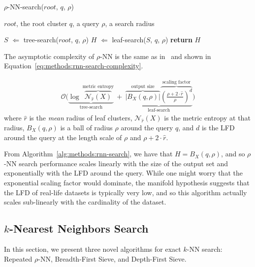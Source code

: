 \begin{algorithm} 
    \caption{$\rho$-NN-search($root$, $q$, $\rho$)} 
    \label{alg:methods:rnn-search} 
    \begin{algorithmic}
        \REQUIRE $root$, the root cluster
        \REQUIRE $q$, a query
        \REQUIRE $\rho$, a search radius

        \STATE $S$ $\Leftarrow$ tree-search($root$, $q$, $\rho$)
        \STATE $H$ $\Leftarrow$ leaf-search($S$, $q$, $\rho$)
        \STATE \textbf{return} $H$
    \end{algorithmic}
\end{algorithm}

The asymptotic complexity of $\rho$-NN is the same as in~\cite{ishaq2019clustered} and shown in Equation~\ref{eq:methods:rnn-search-complexity}.

\begin{gather}
    \mathcal{O}
    \Bigg(
        \underbrace{
            \log~\overbrace{\mathcal{N}_{\hat{r}}(X)}^{\textrm{metric entropy}}
        }_{\textrm{tree-search}}
        \ + \ 
        \underbrace{
            \overbrace{ \big| B_X(q, \rho) \big|}^{\textrm{output size}}
            \overbrace{ \left( \frac{\rho + 2 \cdot \hat{r}}{ \rho} \right) ^ d}^{\textrm{scaling factor}}
        }_{\textrm{leaf-search}}
    \Bigg)
    \label{eq:methods:rnn-search-complexity}
\end{gather}
where $\hat{r}$ is the \textit{mean} radius of leaf clusters, $\mathcal{N}_{\hat{r}}(X)$ is the metric entropy at that radius, $B_X(q, \rho)$ is a ball of radius $\rho$ around the query $q$, and $d$ is the LFD around the query at the length scale of $\rho$ and $\rho + 2 \cdot \hat{r}$.

From Algorithm~\ref{alg:methods:rnn-search}, we have that $H = B_X(q, \rho)$, and so $\rho$-NN search performance scales linearly with the size of the output set and exponentially with the LFD around the query.
While one might worry that the exponential scaling factor would dominate, the manifold hypothesis suggests that the LFD of real-life datasets is typically very low, and so this algorithm actually scales sub-linearly with the cardinality of the dataset.


\subsection{\texorpdfstring{$k$}{k}-Nearest Neighbors Search}
\label{sec:methods:knn-search}

In this section, we present three novel algorithms for exact $k$-NN search:
Repeated $\rho$-NN, Breadth-First Sieve, and Depth-First Sieve.

